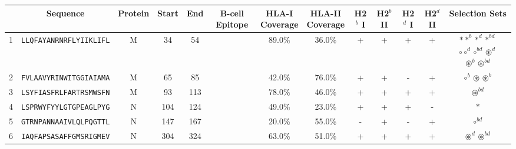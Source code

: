 \begin{tabular}{rcccccccccccc}
\toprule
{} &                        Sequence & Protein &  Start &   End & B-cell Epitope & \Centerstack{HLA-I \\ Coverage} & \Centerstack{HLA-II \\ Coverage} & H2$^{b}$ I & H2$^{b}$ II & H2$^{d}$ I & H2$^{d}$ II &                                                                                                                     Selection Sets \\
\midrule
1  &  \texttt{LLQFAYANRNRFLYIIKLIFL} &       M &     34 &    54 &                &                          89.0\% &                           36.0\% &          + &           + &          + &           + &  \Centerstack{  $\ast \ast^b \ast^d \ast^{bd}$ \\  $\circ \circ^d \circ^{bd} \circledast^d$ \\  $\circledast^b \circledast^{bd}$ } \\
2  &  \texttt{FVLAAVYRINWITGGIAIAMA} &       M &     65 &    85 &                &                          42.0\% &                           76.0\% &          + &           + &          - &           + &                                                                                              $ \circ^b \circledast \circledast^b $ \\
3  &  \texttt{LSYFIASFRLFARTRSMWSFN} &       M &     93 &   113 &                &                          78.0\% &                           46.0\% &          + &           + &          + &           + &                                                                                                               $ \circledast^{bd} $ \\
4  &  \texttt{LSPRWYFYYLGTGPEAGLPYG} &       N &    104 &   124 &                &                          49.0\% &                           23.0\% &          + &           + &          + &           - &                                                                                                                           $ \ast $ \\
5  &  \texttt{GTRNPANNAAIVLQLPQGTTL} &       N &    147 &   167 &                &                          20.0\% &                           55.0\% &          - &           + &          - &           + &                                                                                                                     $ \circ^{bd} $ \\
6  &  \texttt{IAQFAPSASAFFGMSRIGMEV} &       N &    304 &   324 &                &                          63.0\% &                           51.0\% &          + &           + &          + &           + &                                                                                                 $ \circledast^d \circledast^{bd} $ \\

\end{tabular}

